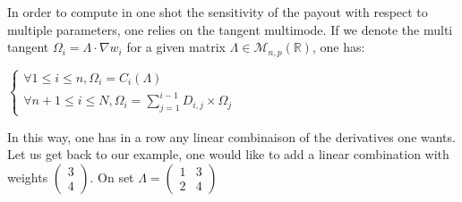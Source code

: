 \documentclass {article}
\begin{document}
				In order to compute in one shot the sensitivity of the payout with respect to multiple parameters, one relies on the 
				tangent multimode.
				If we denote the multi tangent $\Omega_{i}  = \Lambda \cdot \nabla w_{i}$ for a given matrix $\Lambda \in \mathcal{M}_{n, p} (\mathbb{R})$, one has:
				
				\begin{center}
					$\begin{cases} \forall 1  \leq i \leq n, \Omega_{i} = C_{i} (\Lambda) \\ \forall n+1 \leq i \leq N, \Omega_{i} = \displaystyle{\sum_{j=1}^{i-1} {D_{i,j} \times \Omega_{j}}} \end{cases}$
				\end{center}				
				
				In this way, one has in a row any linear combinaison of the derivatives one wants. \\
				Let us get back to our example, one would like to add a linear combination with weights $\begin{pmatrix} 3 \\ 4 \end{pmatrix}$. On set $\Lambda = \begin{pmatrix} 1 & 3 \\ 2 & 4 \end{pmatrix}$
				
				
\end{document}
